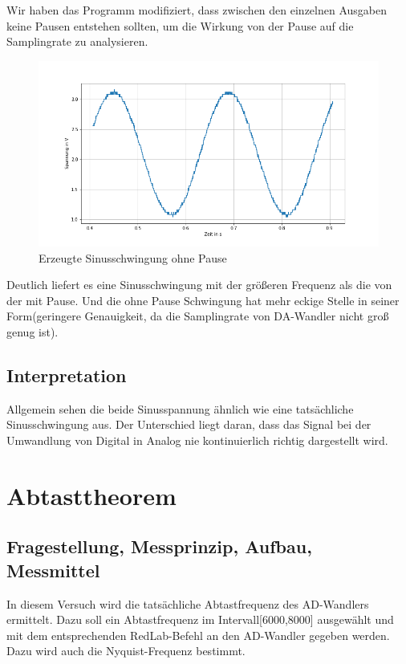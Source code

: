 \documentclass[12pt, oneside, a4paper, \docLanguage]{report}
\begin{document}
\qquad Wir haben das Programm modifiziert, dass zwischen den einzelnen Ausgaben keine Pausen entstehen sollten, um die Wirkung von der Pause auf die Samplingrate zu analysieren.

\begin{figure}[H]
	\centering\small
	\includegraphics[width=15cm]{v4ohne.png}
	\caption{Erzeugte Sinusschwingung ohne Pause}
\end{figure}

Deutlich liefert es eine Sinusschwingung mit der größeren Frequenz als die von der mit Pause. Und die ohne Pause Schwingung hat mehr eckige Stelle in seiner Form(geringere Genauigkeit, da die Samplingrate von DA-Wandler nicht groß genug ist).


\section{Interpretation}
\label{chap:VERSUCH_4_INTERPRETATION}
\qquad Allgemein sehen die beide Sinusspannung ähnlich wie eine tatsächliche Sinusschwingung aus. Der Unterschied liegt daran, dass das Signal bei der Umwandlung von Digital in Analog nie kontinuierlich richtig dargestellt wird. 



%
%
\chapter{Abtasttheorem}
\section{Fragestellung, Messprinzip, Aufbau, Messmittel}
\qquad In diesem Versuch wird die tatsächliche Abtastfrequenz des AD-Wandlers ermittelt. Dazu soll ein Abtastfrequenz im Intervall[6000,8000] ausgewählt und mit dem entsprechenden RedLab-Befehl an den AD-Wandler gegeben werden. Dazu wird auch die Nyquist-Frequenz bestimmt.
\end{document}
